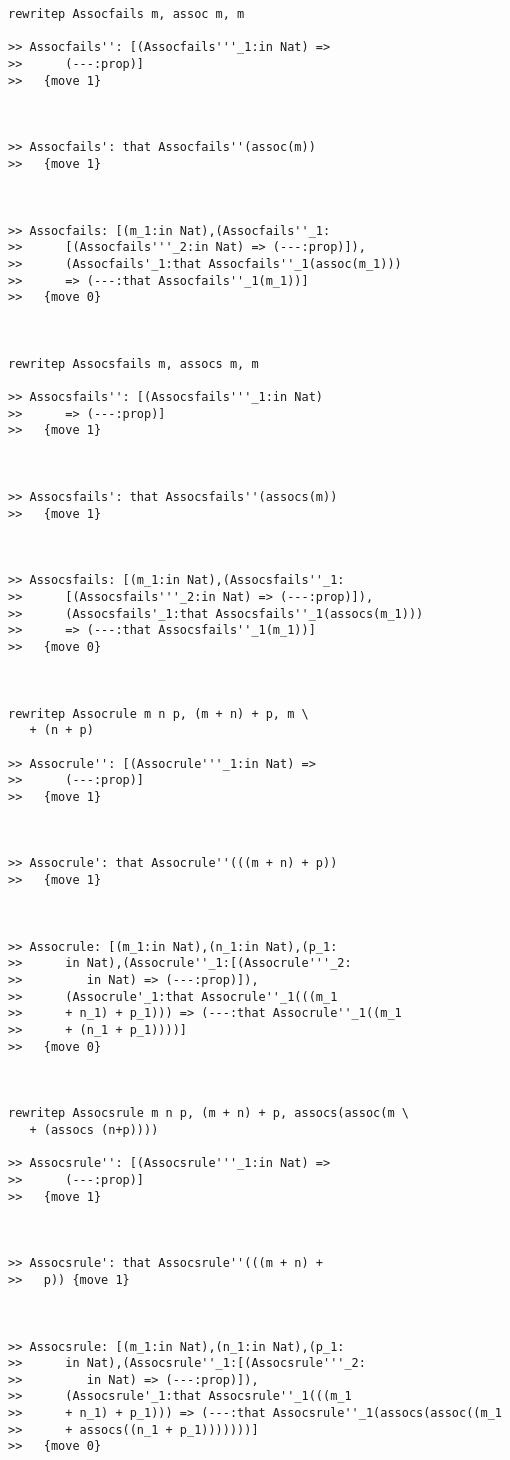 \documentclass[12pt]{article}
\begin{document}
\begin{verbatim}
rewritep Assocfails m, assoc m, m

>> Assocfails'': [(Assocfails'''_1:in Nat) =>
>>      (---:prop)]
>>   {move 1}



>> Assocfails': that Assocfails''(assoc(m))
>>   {move 1}



>> Assocfails: [(m_1:in Nat),(Assocfails''_1:
>>      [(Assocfails'''_2:in Nat) => (---:prop)]),
>>      (Assocfails'_1:that Assocfails''_1(assoc(m_1)))
>>      => (---:that Assocfails''_1(m_1))]
>>   {move 0}



rewritep Assocsfails m, assocs m, m

>> Assocsfails'': [(Assocsfails'''_1:in Nat)
>>      => (---:prop)]
>>   {move 1}



>> Assocsfails': that Assocsfails''(assocs(m))
>>   {move 1}



>> Assocsfails: [(m_1:in Nat),(Assocsfails''_1:
>>      [(Assocsfails'''_2:in Nat) => (---:prop)]),
>>      (Assocsfails'_1:that Assocsfails''_1(assocs(m_1)))
>>      => (---:that Assocsfails''_1(m_1))]
>>   {move 0}



rewritep Assocrule m n p, (m + n) + p, m \
   + (n + p)

>> Assocrule'': [(Assocrule'''_1:in Nat) =>
>>      (---:prop)]
>>   {move 1}



>> Assocrule': that Assocrule''(((m + n) + p))
>>   {move 1}



>> Assocrule: [(m_1:in Nat),(n_1:in Nat),(p_1:
>>      in Nat),(Assocrule''_1:[(Assocrule'''_2:
>>         in Nat) => (---:prop)]),
>>      (Assocrule'_1:that Assocrule''_1(((m_1
>>      + n_1) + p_1))) => (---:that Assocrule''_1((m_1
>>      + (n_1 + p_1))))]
>>   {move 0}



rewritep Assocsrule m n p, (m + n) + p, assocs(assoc(m \
   + (assocs (n+p))))

>> Assocsrule'': [(Assocsrule'''_1:in Nat) =>
>>      (---:prop)]
>>   {move 1}



>> Assocsrule': that Assocsrule''(((m + n) +
>>   p)) {move 1}



>> Assocsrule: [(m_1:in Nat),(n_1:in Nat),(p_1:
>>      in Nat),(Assocsrule''_1:[(Assocsrule'''_2:
>>         in Nat) => (---:prop)]),
>>      (Assocsrule'_1:that Assocsrule''_1(((m_1
>>      + n_1) + p_1))) => (---:that Assocsrule''_1(assocs(assoc((m_1
>>      + assocs((n_1 + p_1)))))))]
>>   {move 0}




\end{verbatim}
\end{document}
